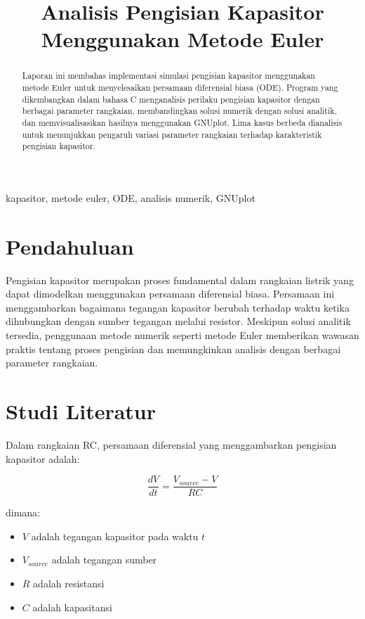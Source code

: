\documentclass[conference]{IEEEtran}
\begin{document}
\title{Analisis Pengisian Kapasitor Menggunakan Metode Euler}

\author{
}

\maketitle

\begin{abstract}
Laporan ini membahas implementasi simulasi pengisian kapasitor menggunakan metode Euler untuk menyelesaikan persamaan diferensial biasa (ODE). Program yang dikembangkan dalam bahasa C menganalisis perilaku pengisian kapasitor dengan berbagai parameter rangkaian, membandingkan solusi numerik dengan solusi analitik, dan memvisualisasikan hasilnya menggunakan GNUplot. Lima kasus berbeda dianalisis untuk menunjukkan pengaruh variasi parameter rangkaian terhadap karakteristik pengisian kapasitor.
\end{abstract}

\begin{IEEEkeywords}
kapasitor, metode euler, ODE, analisis numerik, GNUplot
\end{IEEEkeywords}

\section{Pendahuluan}
Pengisian kapasitor merupakan proses fundamental dalam rangkaian listrik yang dapat dimodelkan menggunakan persamaan diferensial biasa. Persamaan ini menggambarkan bagaimana tegangan kapasitor berubah terhadap waktu ketika dihubungkan dengan sumber tegangan melalui resistor. Meskipun solusi analitik tersedia, penggunaan metode numerik seperti metode Euler memberikan wawasan praktis tentang proses pengisian dan memungkinkan analisis dengan berbagai parameter rangkaian.

\section{Studi Literatur}
Dalam rangkaian RC, persamaan diferensial yang menggambarkan pengisian kapasitor adalah:

\[\frac{dV}{dt} = \frac{V_{source} - V}{RC}\]

dimana:
\begin{itemize}
\item $V$ adalah tegangan kapasitor pada waktu $t$
\item $V_{source}$ adalah tegangan sumber
\item $R$ adalah resistansi
\item $C$ adalah kapasitansi
\end{itemize}
\end{document}

